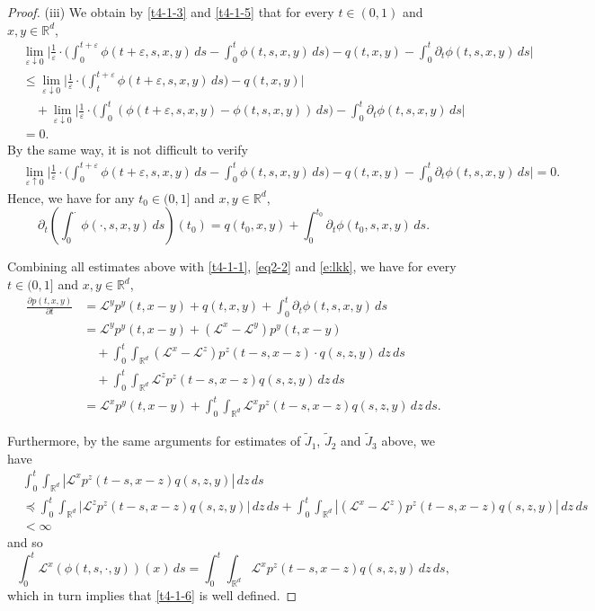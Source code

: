 \documentclass[a4paper,11pt]{amsart}
\renewcommand{\le}{\leqslant}
\newcommand{\R}{\mathds R}
\newcommand{\p}{\preceq}
\newcommand{\e}{ \varepsilon}
\def\LL{{\mathcal L}}
\theoremstyle{definition}
\begin{document}
\begin{proof}
{(iii)} We obtain by \eqref{t4-1-3} and \eqref{t4-1-5}  that for every $t \in (0,1)$ and $x,y \in \R^d$,
\begin{align*}
&\lim_{\e \downarrow 0}\Bigg|\frac{1}{\e}
\cdot \Big(\int_0^{t+\e}\phi(t+\e,s,x,y)\,ds-
\int_0^{t}\phi(t,s,x,y)\,ds\Big)-q(t,x,y)-\int_0^t \partial_t \phi(t,s,x,y)\,ds\Bigg|\\
&\le \lim_{\e \downarrow 0}\Bigg|\frac{1}{\e}\cdot\Big(\int_t^{t+\e}
\phi(t+\e,s,x,y)\,ds\Big)-q(t,x,y)\Bigg|\\
&\quad+\lim_{\e \downarrow 0}\Bigg|\frac{1}{\e}\cdot\Big(\int_0^{t}
(\phi(t+\e,s,x,y)-\phi(t,s,x,y))\,ds\Big)-\int_0^t \partial_t \phi(t,s,x,y)\,ds\Bigg|\\
&=0.
\end{align*}
By the same way, it is not difficult to verify
\begin{align*}
&\lim_{\e \uparrow 0}\Bigg|\frac{1}{\e}
\cdot \Big(\int_0^{t+\e}\phi(t+\e,s,x,y)\,ds-
\int_0^{t}\phi(t,s,x,y)\,ds\Big)-q(t,x,y)-\int_0^t \partial_t \phi(t,s,x,y)\,ds\Bigg|=0.
\end{align*}
Hence, we have for any $t_0\in (0,1]$ and $x,y\in \R^d$,
\begin{equation*}
\partial_t\left(\int_0^{\cdot}\phi(\cdot,s,x,y)\,ds\right)(t_0)=q(t_0,x,y)+\int_0^{t_0}\partial_t \phi(t_0,s,x,y)\,ds.
\end{equation*}

Combining all estimates above with \eqref{t4-1-1}, \eqref{eq2-2} and \eqref{e:lkk},
we have for every $t \in (0,1]$ and $x,y \in \R^d$,
\begin{equation}\label{t4-1-6}
\begin{split}
\frac{\partial p(t,x,y)}{\partial t}
&= \LL^y p^y(t,x-y)+q(t,x,y)+\int_0^t \partial_t \phi(t,s,x,y)\,ds\\
&= \LL^y p^y(t,x-y)+( \LL^x- \LL^y)p^y(t,x-y)\\
&\quad +\int_0^t
\int_{\R^d}( \LL^x- \LL^z)p^z(t-s,x-z)\cdot q(s,z,y)\,dz\,ds\\
&\quad +\int_0^t \int_{\R^d} \LL^z p^z(t-s,x-z)q(s,z,y)\,dz\,ds\\
&= \LL^x p^y(t,x-y)+\int_0^t\int_{\R^d} \LL^x p^z(t-s,x-z)q(s,z,y)\,dz\,ds.
\end{split}
\end{equation}


Furthermore, by the same arguments for estimates of $\tilde J_1$, $\tilde J_2$ and $\tilde J_3$ above, we have
\begin{equation}\label{t4-1-7a}
\begin{split}
& \int_0^t\int_{\R^d}|  \LL^x p^z(t-s,x-z)q(s,z,y)|\,dz\,ds\\
&\p \int_0^t\int_{\R^d}\big|  \LL^z p^z(t-s,x-z)q(s,z,y)\big|\,dz\,ds+\int_0^t \int_{\R^d}|( \LL^x- \LL^z) p^z(t-s,x-z)q(s,z,y)|\,dz\,ds\\
&<\infty
\end{split}
\end{equation} and so
$$\int_0^t \LL^x(\phi(t,s,\cdot,y))(x)\,ds= \int_0^t\int_{\R^d}  \LL^x p^z(t-s,x-z)q(s,z,y)\,dz\,ds,$$ which in turn implies that \eqref{t4-1-6} is well defined.


\end{proof}
\end{document}
